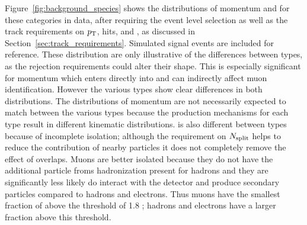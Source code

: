 Figure~\ref{fig:background_species} shows the distributions of momentum and \dedx for these categories in data, after requiring the event level selection as well as the track requirements on $p_{\mathrm{T}}$, hits, and \Nsplit, as discussed in Section~\ref{sec:track_requirements}.
Simulated signal events are included for reference.
These distribution are only illustrative of the differences between types, as the rejection requirements could alter their shape. 
This is especially significant for momentum which enters directly into \ep and can indirectly affect muon identification.
However the various types show clear differences in both distributions.
The distributions of momentum are not necessarily expected to match between the various types because the production mechanisms for each type result in different kinematic distributions.
\dedx is also different between types because of incomplete isolation; although the requirement on $N_{\mathrm{split}}$ helps to reduce the contribution of nearby particles it does not completely remove the effect of overlaps.
Muons are better isolated because they do not have the additional particle froms hadronization present for hadrons and they are significantly less likely do interact with the detector and produce secondary particles compared to hadrons and electrons.
Thus muons have the smallest fraction of \dedx above the threshold of 1.8 \MeVgcm; hadrons and electrons have a larger fraction above this threshold.

